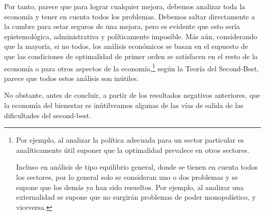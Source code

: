 \documentclass[10pt,a4paper]{article}
\begin{document}
Por tanto, parece que para lograr cualquier mejora, debemos analizar toda la economía y tener en cuenta todos los problemas. Debemos saltar directamente a la cumbre para estar seguros de una mejora, pero es evidente que esto sería epistemológica, administrativa y políticamente imposible. Más aún, considerando que la mayoría, si no todos, los análisis económicos se basan en el supuesto de que las condiciones de optimalidad de primer orden se satisfacen en el resto de la economía o para otros aspectos de la economía,\footnote{%
    Por ejemplo, al analizar la política adecuada para un sector particular es analíticamente útil suponer que la optimalidad prevalece en otros sectores. 

Incluso en análisis de tipo equilibrio general, donde se tienen en cuenta todos los sectores, por lo general solo se consideran uno o dos problemas y se supone que los demás ya han sido resueltos. Por ejemplo, al analizar una externalidad se supone que no surgirán problemas de poder monopolístico, y viceversa.
} según la Teoría del Second-Best, parece que todos estos análisis son inútiles. 

No obstante, antes de concluir, a partir de los resultados negativos anteriores, que la economía del bienestar es inútilveamos algunas de las vías de salida de las dificultades del second-best.
\end{document}
